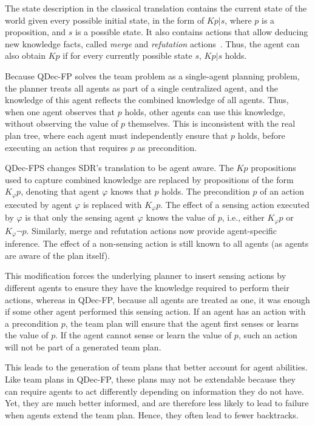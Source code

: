 \documentclass[letterpaper]{article}
\theoremstyle{definition}
\begin{document}
The state description in the classical translation contains the current state of the world given every possible initial state, in the form of $Kp|s$, where $p$ is a proposition, and $s$ is a possible state. It also contains actions that allow deducing new knowledge facts, called {\em merge} and {\em refutation} actions~\citep{PalaciosG09}. Thus, the agent can also obtain $Kp$ if for every currently possible state $s$, $Kp|s$ holds.



Because QDec-FP solves the team problem as a single-agent planning problem, the planner treats all agents as part of a single centralized agent, and the knowledge of this agent reflects the combined knowledge of all agents. Thus, when one agent observes that $p$ holds, other agents can use this knowledge, without observing the value of $p$ themselves. This is inconsistent with the real plan tree, where each agent must independently ensure that $p$ holds, before executing an action that requires $p$ as precondition.

QDec-FPS changes SDR's translation to be agent aware.
The $Kp$ propositions used to capture combined knowledge
are replaced by propositions of the form $K_{\varphi}p$, denoting that agent $\varphi$ knows that $p$ holds. The precondition $p$ of an action executed by agent $\varphi$ is replaced with  $K_{\varphi}p$. The effect of a sensing action executed by $\varphi$ is that only the sensing agent $\varphi$ knows the value of $p$, i.e., either $K_{\varphi}p$ or $K_{\varphi}\neg p$.
Similarly, merge and refutation actions now provide  agent-specific inference. The effect of a non-sensing action is still known to all agents (as agents are aware of the plan itself).

This modification forces the underlying planner to insert sensing actions by different agents to ensure they have the knowledge required to perform their actions, whereas in QDec-FP, because all agents are treated as one, it was enough if some other agent performed this sensing action. If an agent has an action with a precondition $p$, the team plan will ensure that the agent first senses or learns the value of $p$.
If the agent cannot sense or learn the value of $p$, such an action will not be part of a generated team plan.

This leads to the generation of team plans that better account for agent abilities. Like team plans in QDec-FP, these plans may not be extendable because they can require agents to act differently depending on information they do not have. Yet, they are much better informed, and are therefore less likely to lead to failure when agents extend the team plan. Hence, they often lead to fewer backtracks. %
\end{document}
